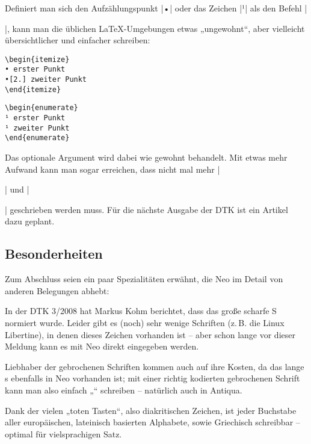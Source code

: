 \documentclass[ngerman]{dtk}
\newcommand{\fixme}[1]{\marginpar{\vspace*{-.5\baselineskip}\footnotesize\color{red}#1}}
\begin{document}
{Definiert man sich den Aufzählungspunkt |•| oder das Zeichen |¹| als den Befehl |\item|, kann man die üblichen \LaTeX-Umgebungen etwas „ungewohnt“, aber vielleicht übersichtlicher und einfacher schreiben:

\begin{minipage}{.4\textwidth}
\begin{verbatim}
\begin{itemize}
• erster Punkt
•[2.] zweiter Punkt
\end{itemize} 
\end{verbatim}
\end{minipage}
\hfill
\begin{minipage}{.4\textwidth}
\begin{verbatim}
\begin{enumerate}
¹ erster Punkt
¹ zweiter Punkt
\end{enumerate} 
\end{verbatim}
\end{minipage}

Das optionale Argument wird dabei wie gewohnt behandelt. Mit etwas mehr Aufwand kann man sogar erreichen, dass nicht mal mehr |\begin{itemize}| und |\end{itemize}| geschrieben werden muss. Für die nächste Ausgabe der DTK ist ein Artikel dazu geplant.

\subsection{Besonderheiten}
Zum Abschluss seien ein paar Spezialitäten erwähnt, die Neo im Detail von anderen Belegungen abhebt:

In der DTK 3/2008 hat Markus Kohm berichtet, dass das große scharfe S  normiert wurde. Leider gibt es (noch) sehr wenige Schriften (z.\,B. die Linux Libertine), in denen dieses Zeichen vorhanden ist – aber schon lange vor dieser Meldung kann es mit Neo direkt eingegeben werden.

Liebhaber der gebrochenen Schriften kommen auch auf ihre Kosten, da das lange s  ebenfalls in Neo vorhanden ist; mit einer richtig kodierten gebrochenen Schrift kann man also einfach „“ schreiben – natürlich auch in Antiqua.

Dank der vielen „toten Tasten“, also diakritischen Zeichen, ist jeder Buchstabe aller europäischen, lateinisch basierten Alphabete, sowie Griechisch schreibbar – optimal für vielsprachigen Satz.

}
\end{document}
